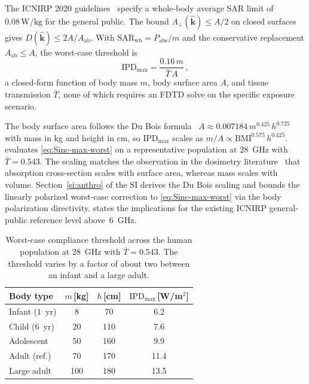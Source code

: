 \documentclass[journal,twocolumn,10pt]{IEEEtran}
\newcommand{\khat}{\hat{\bm{k}}}
\newcommand{\IPD}{\mathrm{IPD}}
\newcommand{\Aab}{A_{\mathrm{ab}}}
\newcommand{\Aperp}{A_\perp}
\newcommand{\Tbar}{\bar{T}}
\begin{document}
The ICNIRP 2020 guidelines~\cite{ICNIRP2020} specify a whole-body
average SAR limit of $0.08\,\mathrm{W/kg}$ for the general public. The bound
$\Aperp(\khat) \le A/2$ on closed surfaces gives
$D(\khat) \le 2A/\Aab$. With $\mathrm{SAR}_{\mathrm{wb}} =
P_{\mathrm{abs}}/m$ and the conservative replacement $\Aab \le A$,
the worst-case threshold is
\begin{equation}\label{eq:Sinc-max-worst}
  \IPD_{\mathrm{max}} = \frac{0.16\,m}{\Tbar\,A}\, ,
\end{equation}
a closed-form function of body mass $m$, body surface area $A$,
and tissue transmission $\Tbar$, none of which requires an FDTD
solve on the specific exposure scenario.

The body surface area follows the Du Bois formula~\cite{DuBois1916} $A
\approx 0.007184\,m^{0.425}\,h^{0.725}$ with mass in kg and height in
cm, so $\IPD_{\mathrm{max}}$ scales as $m/A \propto
\mathrm{BMI}^{0.575}\,h^{0.425}$.  evaluates
\eqref{eq:Sinc-max-worst} on a representative population at
$28$~GHz with $\Tbar = 0.543$. The scaling
matches the observation in the dosimetry
literature~\cite{Hirata2007corr,Dimbylow2002} that absorption
cross-section scales with surface area, whereas mass scales with
volume. Section~\ref{si:anthro} of the SI derives the Du Bois
scaling and bounds the linearly polarized worst-case correction to
\eqref{eq:Sinc-max-worst} via the body polarization directivity.
 states the implications for the existing
ICNIRP general-public reference level above~$6$~GHz.

\begin{table}[!t]
\centering
\caption{Worst-case compliance threshold across the human
population at $28$~GHz with $\Tbar = 0.543$. The threshold
varies by a factor of about two between an infant and a large adult.}
\label{tab:anthro}
\small
\setlength{\tabcolsep}{3pt}
\begin{tabular}{lccc}
\toprule
Body type & $m$\,[kg] & $h$\,[cm] & $\IPD_{\mathrm{max}}$\,[W/m$^2$] \\
\midrule
Infant ($1$~yr) & 8   & 70  & 6.2  \\
Child ($6$~yr)  & 20  & 110 & 7.6  \\
Adolescent      & 50  & 160 & 9.9  \\
Adult (ref.)    & 70  & 170 & 11.4 \\
Large adult     & 100 & 180 & 13.5 \\
\bottomrule
\end{tabular}
\end{table}
\end{document}
